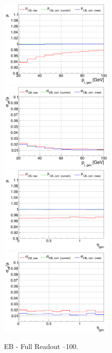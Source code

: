 \begin{figure}
\includegraphics[width=0.495\textwidth]{./plots_pdf/ECAL_plots/plotsNOPU/EB/FULL/pdf/GENPT/EBFULL_GENPT_0020_0100_MuOverBins.pdf}
\includegraphics[width=0.495\textwidth]{./plots_pdf/ECAL_plots/plotsNOPU/EB/FULL/pdf/GENPT/EBFULL_GENPT_0020_0100_EffSigmaOverBins.pdf}
\includegraphics[width=0.495\textwidth]{./plots_pdf/ECAL_plots/plotsNOPU/EB/FULL/pdf/GENETA/EBFULL_GENETA_0020_0100_MuOverBins.pdf}
\includegraphics[width=0.495\textwidth]{./plots_pdf/ECAL_plots/plotsNOPU/EB/FULL/pdf/GENETA/EBFULL_GENETA_0020_0100_EffSigmaOverBins.pdf}
\caption{EB - Full Readout --100\GeV.}
\end{figure}


